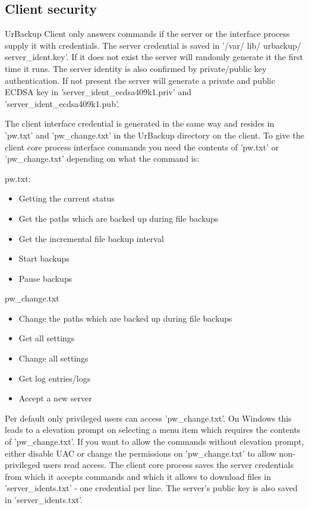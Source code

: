 \documentclass[a4paper,10pt]{article}
\begin{document}
\subsection{Client security}

UrBackup Client only answers commands if the server or the interface process supply it with credentials. The server credential is saved in '/var/ lib/ urbackup/ server\_ident.key'. If it does not exist the server will randomly generate it the first time it runs. The server identity is also confirmed by private/public key authentication. If not present the server will generate a private and public ECDSA key in 'server\_ident\_ecdsa409k1.priv' and 'server\_ident\_ecdsa409k1.pub'. 

The client interface credential is generated in the same way and resides in 'pw.txt' and 'pw\_change.txt' in the UrBackup directory on the client. To give the client core process interface commands you need the contents of 'pw.txt' or 'pw\_change.txt' depending on what the command is:

pw.txt:
\begin{itemize}
  \item Getting the current status
  \item Get the paths which are backed up during file backups
  \item Get the incremental file backup interval
  \item Start backups
  \item Pause backups   
\end{itemize}

pw\_change.txt
\begin{itemize}
  \item Change the paths which are backed up during file backups
  \item Get all settings
  \item Change all settings
  \item Get log entries/logs
  \item Accept a new server
\end{itemize}

Per default only privileged users can access 'pw\_change.txt'. On Windows this leads to a elevation prompt on selecting a menu item which requires the contents of 'pw\_change.txt'. If you want to allow the commands without elevation prompt, either disable UAC or change the permissions on 'pw\_change.txt' to allow non-privileged users read access. 
 The client core process saves the server credentials from which it accepts commands and which it allows to download files in 'server\_idents.txt' - one credential per line. The server's public key is also saved in 'server\_idents.txt'.
\end{document}

